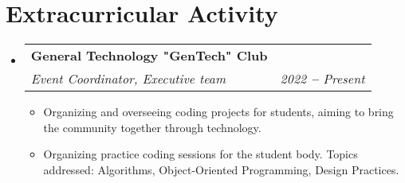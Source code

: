 \documentclass[letterpaper,11pt]{article}
\makeatletter
\newcommand{\resumeItem}[1]{
  \item\small{
    {#1 \vspace{-2pt}}
  }
}
\newcommand{\resumeSubheading}[4]{
  \vspace{-2pt}\item
    \begin{tabular*}{0.97\textwidth}[t]{l@{\extracolsep{\fill}}r}
      \textbf{#1} & #2 \\
      \textit{\small#3} & \textit{\small #4} \\
    \end{tabular*}\vspace{-7pt}
}
\newcommand{\resumeSubHeadingListStart}{\begin{itemize}[leftmargin=0.15in, label={}]}
\newcommand{\resumeSubHeadingListEnd}{\end{itemize}}
\newcommand{\resumeItemListStart}{\begin{itemize}}
\newcommand{\resumeItemListEnd}{\end{itemize}\vspace{-5pt}}
\makeatother
\begin{document}

    \section{Extracurricular Activity}
        \vspace{2pt}
          \resumeSubHeadingListStart
      
          \resumeSubheading
          {General Technology "GenTech" Club}{}
          {Event Coordinator, Executive team}{2022 \textbf{--} Present}
            \resumeItemListStart
                \resumeItem{Organizing and overseeing coding projects for students, aiming to bring the community together through technology.}
                \resumeItem{Organizing practice coding sessions for the student body. Topics addressed: Algorithms, Object-Oriented Programming, Design Practices.}
            \resumeItemListEnd
          

    
  \resumeSubHeadingListEnd








    
\end{document}
